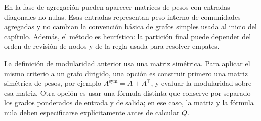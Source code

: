             \begin{observacion}
                En la fase de agregación pueden aparecer matrices de pesos con entradas diagonales no nulas. Esas entradas representan peso interno de comunidades agregadas y no cambian la convención básica de grafos simples usada al inicio del capítulo. Además, el método es heurístico: la partición final puede depender del orden de revisión de nodos y de la regla usada para resolver empates.
            \end{observacion}

            \begin{observacion}
                La definición de modularidad anterior usa una matriz simétrica. Para aplicar el mismo criterio a un grafo dirigido, una opción es construir primero una matriz simétrica de pesos, por ejemplo $A^{\mathrm{sym}}=A+A^\top$, y evaluar la modularidad sobre esa matriz. Otra opción es usar una fórmula distinta que conserve por separado los grados ponderados de entrada y de salida; en ese caso, la matriz y la fórmula nula deben especificarse explícitamente antes de calcular $Q$.
            \end{observacion}

